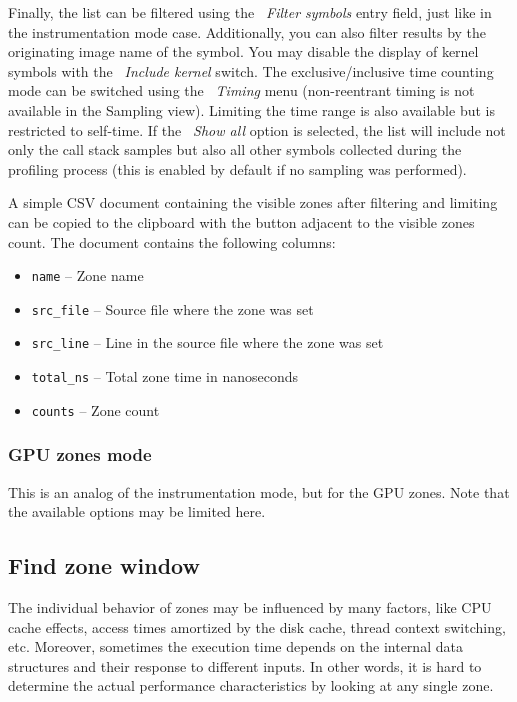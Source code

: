 \documentclass[hidelinks,titlepage,a4paper,twoside]{article}
\begin{document}
Finally, the list can be filtered using the \emph{\faFilter{}~Filter symbols} entry field, just like in the instrumentation mode case. Additionally, you can also filter results by the originating image name of the symbol. You may disable the display of kernel symbols with the \emph{\faHatWizard{}~Include kernel} switch. The exclusive/inclusive time counting mode can be switched using the \emph{~Timing} menu (non-reentrant timing is not available in the Sampling view). Limiting the time range is also available but is restricted to self-time. If the \emph{\faPuzzlePiece{}~Show all} option is selected, the list will include not only the call stack samples but also all other symbols collected during the profiling process (this is enabled by default if no sampling was performed).

A simple CSV document containing the visible zones after filtering and limiting can be copied to the clipboard with the button adjacent to the visible zones count. The document contains the following columns:

\begin{itemize}
  \item \texttt{name} -- Zone name
  \item \texttt{src\_file} -- Source file where the zone was set
  \item \texttt{src\_line} -- Line in the source file where the zone was set
  \item \texttt{total\_ns} -- Total zone time in nanoseconds
  \item \texttt{counts} -- Zone count
\end{itemize}

\subsubsection{GPU zones mode}

This is an analog of the instrumentation mode, but for the GPU zones. Note that the available options may be limited here.

\subsection{Find zone window}
\label{findzone}

The individual behavior of zones may be influenced by many factors, like CPU cache effects, access times amortized by the disk cache, thread context switching, etc. Moreover, sometimes the execution time depends on the internal data structures and their response to different inputs. In other words, it is hard to determine the actual performance characteristics by looking at any single zone.
\end{document}
